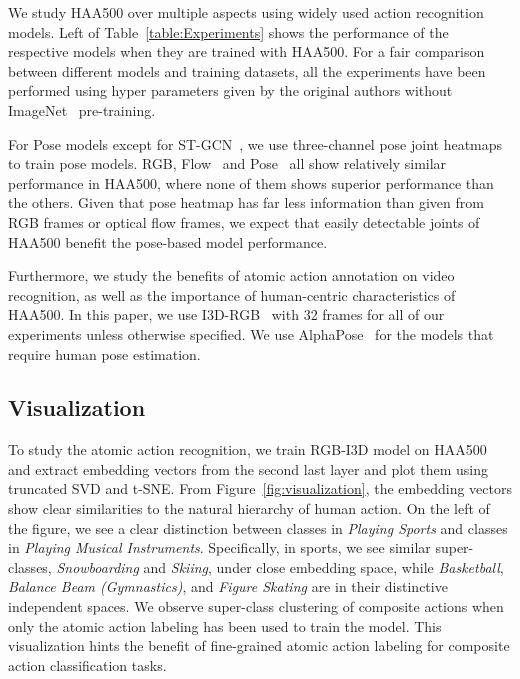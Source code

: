 \documentclass[10pt,twocolumn,letterpaper]{article}
\begin{document}
We study HAA500 over multiple aspects using widely used action recognition models.
Left of Table~\ref{table:Experiments} shows the performance of the respective models when they are trained with HAA500.
For a fair comparison between different models and training datasets, all the experiments have been performed using hyper parameters given by the original authors without ImageNet~\cite{imagenet} pre-training.

For Pose models except for ST-GCN~\cite{stgcn}, we use three-channel pose joint heatmaps~\cite{alphapose} to train pose models. RGB, Flow~\cite{flownet2} and Pose~\cite{alphapose} all show relatively similar performance in HAA500, where none of them shows superior performance than the others.  Given that pose heatmap has far less information than  given from RGB frames or optical flow frames, we expect that easily detectable joints of HAA500  benefit the pose-based model performance. 

Furthermore, we study the benefits of atomic action annotation on video recognition, as well as  the importance of human-centric characteristics of HAA500.
In this paper, we use I3D-RGB~\cite{i3d} with 32 frames for all of our experiments unless otherwise specified. We use AlphaPose~\cite{alphapose} for the models that require human pose estimation. 


\subsection{Visualization}

To study the atomic action recognition, we train RGB-I3D model on HAA500 and extract embedding vectors from the second last layer and plot them using truncated SVD and t-SNE. From Figure~\ref{fig:visualization}, the embedding vectors show clear similarities to the natural hierarchy of human action. On the left of the  figure, we see a clear distinction between classes in \textit{Playing Sports} and classes in \textit{Playing Musical Instruments}. Specifically, in sports, we see similar super-classes, \textit{Snowboarding} and \textit{Skiing}, under close embedding space, while \textit{Basketball}, \textit{Balance Beam (Gymnastics)}, and \textit{Figure Skating} are in their distinctive independent spaces. 
We observe super-class clustering of composite actions when only the atomic action labeling has been used to train the model. 
This visualization hints the benefit of fine-grained atomic action labeling for composite action classification tasks.
\end{document}
